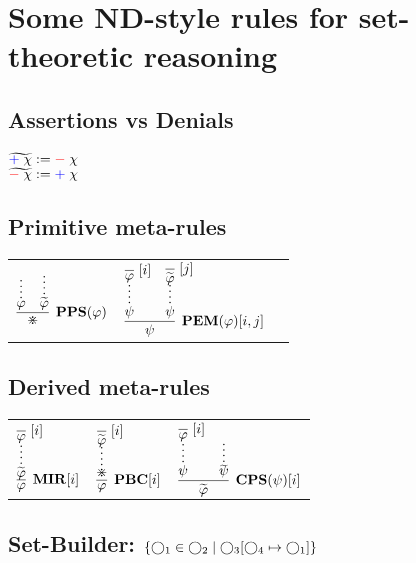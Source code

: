\documentclass[11pt]{article}
\begin{document}
\noindent
\section*{Some ND-style rules for set-theoretic reasoning}
\bigskip


\subsection*{Assertions vs Denials}
$\widetilde{\smash{\mathrel{\color{blue}{+}}{\chi}}}:={\mathrel{\color{red}{-}}{\chi}}$ \\[2mm]
$\widetilde{\smash{\mathrel{\color{red}{-}}{\chi}}}:={\mathrel{\color{blue}{+}}{\chi}}$ 
\bigskip


\subsection*{Primitive meta-rules}

\noindent
\begin{tabular}{ccc}
$
\infer[\mathbf{PPS}(\varphi)]{\divideontimes}{\infer*{\varphi}{} & \infer*{\Opp{\varphi}}{}}
$
\hspace{1cm}
&
$
\infer[\mathbf{PEM(\varphi)}{[i,j]}]{\psi}{
	\infer*{\psi}{\infer[\Label{i}]{\varphi}{}}
	&
	\infer*{\psi}{\infer[\Label{j}]{\Opp{\varphi}}{}}
}
$
\hspace{1cm}
\end{tabular}


\subsection*{Derived meta-rules}

\noindent
\begin{tabular}{ccc}
$
\infer[\mathbf{MIR}{[i]}]{\varphi}{
	\infer*{\Opp{\varphi}}{\infer[\Label{i}]{\varphi}{}}
}
$
\hspace{1cm}
&
$
\infer[\mathbf{PBC}{[i]}]{\varphi}{
	\infer*{\divideontimes}{\infer[\Label{i}]{\Opp{\varphi}}{}}
}
$
\hspace{1cm}
&
$
\infer[\mathbf{CPS}(\psi){[i]}]{\Opp{\varphi}}{
	\infer*{\psi}{\infer[{\Label{i}}]{\varphi}{}}
	&
	\infer*{\Opp{\psi}}{}
}
$
\end{tabular}
\bigskip


\subsection*{Set-Builder: $\{\bigcirc_1\in\bigcirc_2\mid\bigcirc_3[\bigcirc_4\mapsto\bigcirc_1]\}$}
\end{document}
